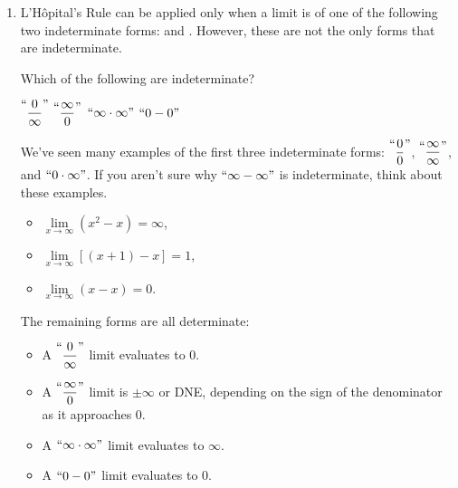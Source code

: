 \documentclass[main]{subfiles}
\begin{document}
\begin{enumerate}
\begin{enumerate}
\end{enumerate}


\textit{These last two problems serve as a quick summary some of the big ideas from this week.}

\item L'Hôpital's Rule can be applied only when a limit is of one of the
 following two indeterminate forms: 
  and 
 \cfitb[\vphantom{$\dfrac00$}]{0.5in}{$\mquote{\infty/\infty}$}. 
 However, these are not the only forms that are indeterminate. 
 
 Which of the following are indeterminate?
 
    \hfill {}
    \hfill $\mquote{\dfrac{0}{\infty}}$
    \hfill \probonly{$\mquote{\dfrac{\infty}{\infty}}$}
           \solonly{\fbox{$\mquote{\dfrac{\infty}{\infty}}$}}
    \hfill $\mquote{\dfrac{\infty}{0}}$
    \hfill $\mquote{\infty\cdot\infty}$
    \hfill \probonly{$\mquote{0\cdot\infty}$}
           \solonly{\fbox{$\mquote{0\cdot\infty}$}}
    \hfill $\mquote{0-0}$
    \hfill \probonly{$\mquote{\infty-\infty}$}
           \solonly{\fbox{$\mquote{\infty-\infty}$}}
    \hfill \null

\begin{solution}
    We've seen many examples of the first three indeterminate forms:
    $\mquote{\dfrac{0}{0}}$, $\mquote{\dfrac{\infty}{\infty}}$, and
    $\mquote{0\cdot\infty}$. If you aren't sure why 
    $\mquote{\infty-\infty}$ is indeterminate, think about these examples.
    \begin{itemize}
        \item $\lim\limits_{x\to\infty} \left(x^2-x\right)=\infty$,
        \item $\lim\limits_{x\to\infty} \left[(x+1)-x\right] = 1$,
        \item $\lim\limits_{x\to\infty} \left(x-x\right)=0$.
    \end{itemize}
    The remaining forms are all determinate:
    \begin{itemize}
        \item A $\mquote{\dfrac{0}{\infty}}$ limit evaluates to $0$.
        \item A $\mquote{\dfrac{\infty}{0}}$ limit is $\pm\infty$ or DNE, depending
            on the sign of the denominator as it approaches $0$.
        \item A $\mquote{\infty\cdot\infty}$ limit evaluates to $\infty$.
        \item A $\mquote{0-0}$ limit evaluates to $0$. 
    \end{itemize}
\end{solution}
             

\end{enumerate}
\end{document}
